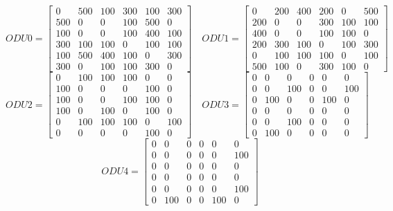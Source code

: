 \[
ODU0=
  \begin{bmatrix}
    0 & 500 & 100 & 300 & 100 & 300 \\
    500 & 0 & 0 & 100 & 500 & 0 \\
    100 & 0 & 0 & 100 & 400 & 100 \\
    300 & 100 & 100 & 0 & 100 & 100 \\
    100 & 500 & 400 & 100 & 0 & 300 \\
    300 & 0 & 100 & 100 & 300 & 0
  \end{bmatrix}
\quad ODU1=
  \begin{bmatrix}
    0 & 200 & 400 & 200 & 0 & 500 \\
    200 & 0 & 0 & 300 & 100 & 100 \\
    400 & 0 & 0 & 100 & 100 & 0 \\
    200 & 300 & 100 & 0 & 100 & 300 \\
    0 & 100 & 100 & 100 & 0 & 100 \\
    500 & 100 & 0 & 300 & 100 & 0
  \end{bmatrix}
\]
\[
ODU2=
  \begin{bmatrix}
    0 & 100 & 100 & 100 & 0 & 0 \\
    100 & 0 & 0 & 0 & 100 & 0 \\
    100 & 0 & 0 & 100 & 100 & 0 \\
    100 & 0 & 100 & 0 & 100 & 0 \\
    0 & 100 & 100 & 100 & 0 & 100 \\
    0 & 0 & 0 & 0 & 100 & 0
  \end{bmatrix}
\quad ODU3=
  \begin{bmatrix}
    0 & 0 & 0 & 0 & 0 & 0 \\
    0 & 0 & 100 & 0 & 0 & 100 \\
    0 & 100 & 0 & 0 & 100 & 0 \\
    0 & 0 & 0 & 0 & 0 & 0 \\
    0 & 0 & 100 & 0 & 0 & 0 \\
    0 & 100 & 0 & 0 & 0 & 0
  \end{bmatrix}
\]
\[
ODU4=
  \begin{bmatrix}
    0 & 0 & 0 & 0 & 0 & 0 \\
    0 & 0 & 0 & 0 & 0 & 100 \\
    0 & 0 & 0 & 0 & 0 & 0 \\
    0 & 0 & 0 & 0 & 0 & 0 \\
    0 & 0 & 0 & 0 & 0 & 100 \\
    0 & 100 & 0 & 0 & 100 & 0
  \end{bmatrix}
\]

